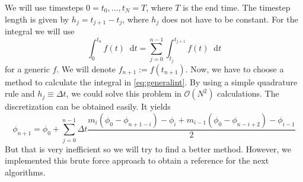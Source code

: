 \documentclass[12pt,a4paper,twoside, open=right]{scrreprt}
\theoremstyle{definition}
\theoremstyle{plain}
\newcommand{\D}{\mathop{}\!\mathrm{d}}
\begin{document}
We will use timesteps $0=t_0,\dotsc,t_N=T$, where $T$ is the end time. The timestep length is given by $h_j=t_{j+1}-t_j$, where $h_j$ does not have to be constant. For the integral we will use 
\begin{equation}
    \int_0^{t_n}f(t)\D t=\sum_{j=0}^{n-1}\int_{t_j}^{t_{j+1}}f(t)\D t\label{eq:generalint}
\end{equation}
for a generic $f$. We will denote $f_{n+1}:=f(t_{n+1})$. Now, we have to choose a method to calculate the integral in \eqref{eq:generalint}. By using a simple quadrature rule and $h_j\equiv \Delta t$, we could solve this problem in $\mathcal{O}(N^2)$ calculations. The discretization can be obtained easily. It yields
\begin{equation}
    \phi_{n+1}=\phi_0 + \sum_{j=0}^{n-1}\Delta t\frac{m_i(\phi_0-\phi_{n+1-i})-\phi_i+m_{i-1}(\phi_0-\phi_{n-i+2})-\phi_{i-1}}{2}
\end{equation}
But that is very inefficient so we will try to find a better method. However, we implemented this brute force approach to obtain a reference for the next algorithms.
\end{document}
